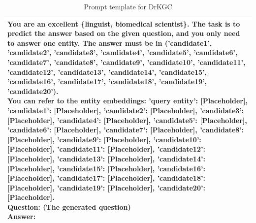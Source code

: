 \documentclass[11pt]{article}
\begin{document}
\begin{table}[ht]
  \centering
  \begin{adjustbox}{width=\linewidth}
  \begin{tabular}{|p{1.0\linewidth}|}
    \hline
    {\footnotesize\ttfamily\raggedright\sloppy
You are an excellent \{linguist, biomedical scientist\}. The task is to predict the answer based on the given question, and you only need to answer one entity. The answer must be in ('candidate1', 'candidate2', 'candidate3', 'candidate4', 'candidate5', 'candidate6', 'candidate7', 'candidate8', 'candidate9', 'candidate10', 'candidate11', 'candidate12', 'candidate13', 'candidate14', 'candidate15', 'candidate16', 'candidate17', 'candidate18', 'candidate19', 'candidate20').
\\
You can refer to the entity embeddings: 'query entity': [Placeholder], 'candidate1': [Placeholder], 'candidate2': [Placeholder], 'candidate3': [Placeholder], 'candidate4': [Placeholder], 'candidate5': [Placeholder], 'candidate6': [Placeholder], 'candidate7': [Placeholder], 'candidate8': [Placeholder], 'candidate9': [Placeholder], 'candidate10': [Placeholder], 'candidate11': [Placeholder], 'candidate12': [Placeholder], 'candidate13': [Placeholder], 'candidate14': [Placeholder], 'candidate15': [Placeholder], 'candidate16': [Placeholder], 'candidate17': [Placeholder], 'candidate18': [Placeholder], 'candidate19': [Placeholder], 'candidate20': [Placeholder]. 
\\
Question: (The generated question) 
\\
Answer:
    }\\ \hline
  \end{tabular}
  \end{adjustbox}
    \caption{Prompt template for DrKGC}
  \label{tab:prompt_template}
\end{table}




\end{document}
